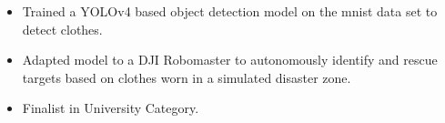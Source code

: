 \begin{itemize}
\item Trained a YOLOv4 based object detection model on the mnist data set to detect clothes.
\item Adapted model to a DJI Robomaster to autonomously identify and rescue targets based on clothes worn in a simulated disaster zone.
\item Finalist in University Category.
\end{itemize}